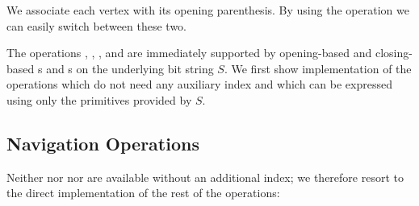 \bigbreak

We associate each vertex with its opening parenthesis.
By using the operation \match{} we can easily switch between these two.

The operations \preRank{}, \preSelect{}, \postRank{}, and \postSelect{} are immediately supported by opening-based and closing-based \rank{}s and \select{}s on the underlying bit string $S$.
We first show implementation of the operations which do not need any auxiliary index and which can be expressed using only the primitives provided by $S$.

\begin{algorithm}
\begin{algorithmic}
	\State {}
\EndFunction
\end{algorithmic}
\end{algorithm}

\begin{algorithm}
\begin{algorithmic}
	\State {} 
\EndFunction
\end{algorithmic}
\end{algorithm}

\subsection{Navigation Operations}

\begin{algorithm}
\begin{algorithmic}
	\State {}
\EndFunction
\end{algorithmic}
\end{algorithm}

Neither \degree{} nor \childRank{} nor \childSelect{} are available without an additional index; we therefore resort to the direct implementation of the rest of the \childAny{} operations:

\begin{algorithm}
\begin{algorithmic}
	\State {}
\EndFunction
\end{algorithmic}
\end{algorithm}

\begin{algorithm}
\begin{algorithmic}
	\State {}
\EndFunction
\end{algorithmic}
\end{algorithm}

